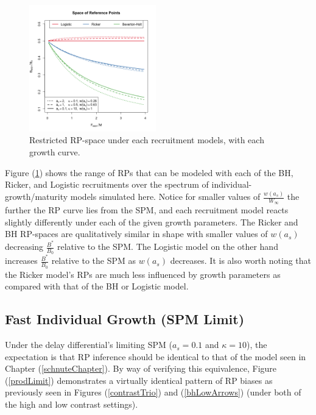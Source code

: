 %
\begin{figure}
\vspace{-0.5cm}
\includegraphics[width=0.49\textwidth]{../ddBias/rpTriptic.png}
\vspace{-0.75cm}
\caption{Restricted RP-space under each recruitment models,
with each growth curve.}\label{rpTriptic}
\end{figure}
%
Figure (\ref{rpTriptic}) shows the range of RPs that can be modeled with each
of the BH, Ricker, and Logistic recruitments over the spectrum of
individual-growth/maturity models simulated here. Notice for smaller values of 
$\frac{w(a_s)}{W_\infty}$ the further the RP curve lies from the SPM,
and each recruitment model reacts slightly differently under each of the given growth
parameters. The Ricker and BH RP-spaces are qualitatively similar in shape
with smaller values of $w(a_s)$ decreasing $\frac{B^*}{B_0}$ relative to the SPM. 
The Logistic model on the other hand increases $\frac{B^*}{B_0}$ relative to 
the SPM as $w(a_s)$ decreases. It is also worth noting that the Ricker model's
RPs are much less influenced by growth parameters as compared with that of the
BH or Logistic model.

%
\subsection{Fast Individual Growth (SPM Limit)\label{fast}}

%
Under the delay differential's limiting SPM ($a_s=0.1$ and $\kappa=10$),
the expectation is that RP inference should be identical to that of the model seen in
Chapter (\ref{schnuteChapter}). By way of verifying this equivalence, Figure (\ref{prodLimit})
demonstrates a virtually identical pattern of RP biases as previously seen in
Figures (\ref{contrastTrio}) and (\ref{bhLowArrows}) (under both of the high and
low contrast settings).

